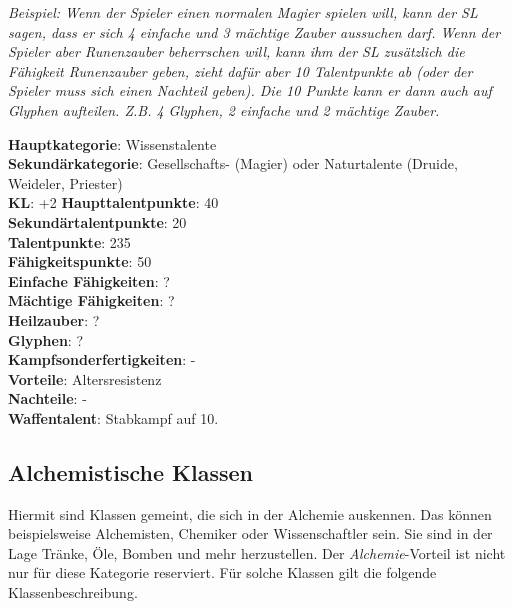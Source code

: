 \textit{Beispiel: Wenn der Spieler einen normalen Magier spielen will, kann der SL sagen, dass er sich 4 einfache und 3 mächtige Zauber aussuchen darf. Wenn der Spieler aber Runenzauber beherrschen will, kann ihm der SL zusätzlich die Fähigkeit Runenzauber geben, zieht dafür aber 10 Talentpunkte ab (oder der Spieler muss sich einen Nachteil geben). Die 10 Punkte kann er dann auch auf Glyphen aufteilen. Z.B. 4 Glyphen, 2 einfache und 2 mächtige Zauber.}

\textbf{Hauptkategorie}: Wissenstalente \\
\textbf{Sekundärkategorie}: Gesellschafts- (Magier) oder Naturtalente (Druide, Weideler, Priester) \\
\textbf{KL}: +2
\textbf{Haupttalentpunkte}: 40 \\
\textbf{Sekundärtalentpunkte}: 20 \\
\textbf{Talentpunkte}: 235 \\
\textbf{Fähigkeitspunkte}: 50 \\
\textbf{Einfache Fähigkeiten}: ? \\
\textbf{Mächtige Fähigkeiten}: ? \\
\textbf{Heilzauber}: ? \\
\textbf{Glyphen}: ? \\
\textbf{Kampfsonderfertigkeiten}: - \\
\textbf{Vorteile}: Altersresistenz \\
\textbf{Nachteile}: - \\
\textbf{Waffentalent}: Stabkampf auf 10.

\subsection{Alchemistische Klassen}
Hiermit sind Klassen gemeint, die sich in der Alchemie auskennen. Das können beispielsweise Alchemisten, Chemiker oder Wissenschaftler sein. Sie sind in der Lage Tränke, Öle, Bomben und mehr herzustellen. Der \textit{Alchemie}-Vorteil ist nicht nur für diese Kategorie reserviert. Für solche Klassen gilt die folgende Klassenbeschreibung.

